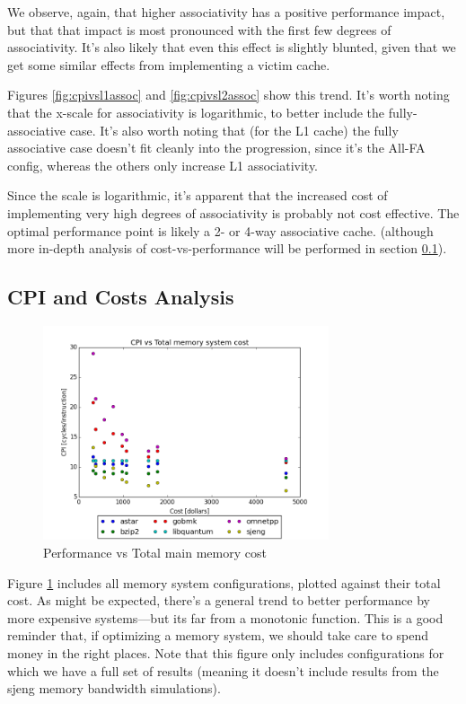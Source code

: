 \documentclass{article}
\begin{document}
We observe, again, that higher associativity has a positive performance impact,
but that that impact is most pronounced with the first few degrees of
associativity. It's also likely that even this effect is slightly blunted, given
that we get some similar effects from implementing a victim cache.

Figures \ref{fig:cpivsl1assoc} and \ref{fig:cpivsl2assoc} show this trend. It's
worth noting that the x-scale for associativity is logarithmic, to better
include the fully-associative case. It's also worth noting that  (for the L1
cache) the fully associative case doesn't fit cleanly into the progression,
since it's the All-FA config, whereas the others only increase L1 associativity.

Since the scale is logarithmic, it's apparent that the increased cost of
implementing very high degrees of associativity is probably not cost effective.
The optimal performance point is likely a 2- or 4-way associative cache.
(although more in-depth analysis of cost-vs-performance will be performed in
section \ref{sec:cost}).

\subsection{CPI and Costs Analysis} \label{sec:cost}

\begin{figure}[ht]
    \centering
    \includegraphics[width=0.75\textwidth]{plots/CPI_vs_Total_memory_system_cost.png}
    \caption{Performance vs Total main memory cost}
    \label{fig:cpivstotalcost}
\end{figure}

Figure \ref{fig:cpivstotalcost} includes all memory system configurations,
plotted against their total cost. As might be expected, there's a general trend
to better performance by more expensive systems---but its far from a monotonic
function. This is a good reminder that, if optimizing a memory system, we should
take care to spend money in the right places. Note that this figure only
includes configurations for which we have a full set of results (meaning it
doesn't include results from the sjeng memory bandwidth simulations).
\end{document}
